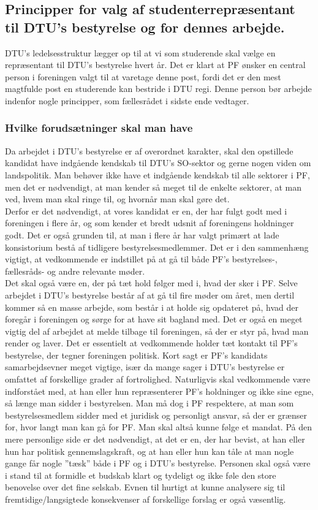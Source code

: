 \subsection{Principper for valg af studenterrepræsentant til DTU’s bestyrelse og for dennes arbejde.}
DTU’s ledelsesstruktur lægger op til at vi som studerende skal vælge en repræsentant til DTU’s bestyrelse hvert år. Det er klart at PF ønsker en central person i foreningen valgt til at varetage denne post, fordi det er den mest magtfulde post en studerende kan bestride i DTU regi. Denne person bør arbejde indenfor nogle principper, som fællesrådet i sidste ende vedtager. 

\subsubsection{Hvilke forudsætninger skal man have}
Da arbejdet i DTU’s bestyrelse er af overordnet karakter, skal den opstillede kandidat have indgående kendskab til DTU’s SO-sektor og gerne nogen viden om landspolitik. Man behøver ikke have et indgående kendskab til alle sektorer i PF, men det er nødvendigt, at man kender så meget til de enkelte sektorer, at man ved, hvem man skal ringe til, og hvornår man skal gøre det.\\

Derfor er det nødvendigt, at vores kandidat er en, der har fulgt godt med i foreningen i flere år, og som kender et bredt udsnit af foreningens holdninger godt. Det er også grunden til, at man i flere år har valgt primært at lade konsistorium bestå af tidligere bestyrelsesmedlemmer. Det er i den sammenhæng vigtigt, at vedkommende er indstillet på at gå til både PF's bestyrelses-, fællesråds- og andre relevante møder.\\

Det skal også være en, der på tæt hold følger med i, hvad der sker i PF. Selve arbejdet i DTU’s bestyrelse består af at gå til fire møder om året, men dertil kommer så en masse arbejde, som består i at holde sig opdateret på, hvad der foregår i foreningen og sørge for at have sit bagland med. Det er også en meget vigtig del af arbejdet at melde tilbage til foreningen, så der er styr på, hvad man render og laver. Det er essentielt at vedkommende holder tæt kontakt til PF’s bestyrelse, der tegner foreningen politisk. Kort sagt er PF’s kandidats samarbejdsevner meget vigtige, især da mange sager i DTU’s bestyrelse er omfattet af forskellige grader af fortrolighed. Naturligvis skal vedkommende være indforstået med, at han eller hun repræsenterer PF’s holdninger og ikke sine egne, så længe man sidder i bestyrelsen. Man må dog i PF respektere, at man som bestyrelsesmedlem sidder med et juridisk og personligt ansvar, så der er grænser for, hvor langt man kan gå for PF. Man skal altså kunne følge et mandat. På den mere personlige side er det nødvendigt, at det er en, der har bevist, at han eller hun har politisk gennemslagskraft, og at han eller hun kan tåle at man nogle gange får nogle ”tæsk” både i PF og i DTU’s bestyrelse. Personen skal også være i stand til at formidle et budskab klart og tydeligt og ikke føle den store benovelse over det fine selskab. Evnen til hurtigt at kunne analysere sig til fremtidige/langsigtede konsekvenser af forskellige forslag er også væsentlig. 

